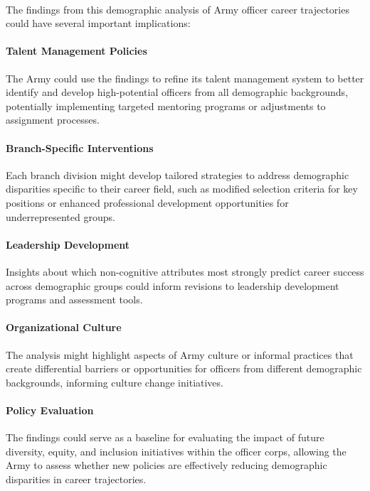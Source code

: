\documentclass[../main.tex]{subfiles}
\begin{document}

\paragraph{} The findings from this demographic analysis of Army officer career trajectories could have several important implications:

\paragraph{Talent Management Policies} The Army could use the findings to refine its talent management system to better identify and develop high-potential officers from all demographic backgrounds, potentially implementing targeted mentoring programs or adjustments to assignment processes.

\paragraph{Branch-Specific Interventions} Each branch division might develop tailored strategies to address demographic disparities specific to their career field, such as modified selection criteria for key positions or enhanced professional development opportunities for underrepresented groups.

\paragraph{Leadership Development} Insights about which non-cognitive attributes most strongly predict career success across demographic groups could inform revisions to leadership development programs and assessment tools.

\paragraph{Organizational Culture} The analysis might highlight aspects of Army culture or informal practices that create differential barriers or opportunities for officers from different demographic backgrounds, informing culture change initiatives.

\paragraph{Policy Evaluation} The findings could serve as a baseline for evaluating the impact of future diversity, equity, and inclusion initiatives within the officer corps, allowing the Army to assess whether new policies are effectively reducing demographic disparities in career trajectories.
\end{document}
